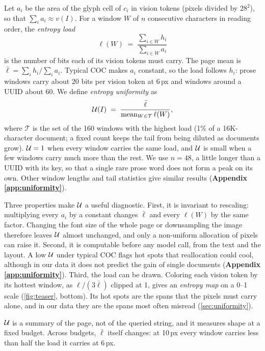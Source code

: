 Let $a_i$ be the area of the glyph cell of $c_i$ in vision tokens (pixels divided by $28^2$), so that $\sum_i a_i \approx v(I)$.
For a window $W$ of $n$ consecutive characters in reading order, the \emph{entropy load}
\begin{equation}
  \ell(W) \;=\; \frac{\sum_{i\in W} h_i}{\sum_{i\in W} a_i}
  \label{eq:load}
\end{equation}
is the number of bits each of its vision tokens must carry.
The page mean is $\bar\ell = \sum_i h_i / \sum_i a_i$.
Typical COC makes $a_i$ constant, so the load follows $h_i$: prose windows carry about 20 bits per vision token at 6\,px and windows around a UUID about 60.
We define \emph{entropy uniformity} as
\begin{equation}
  \mathcal{U}(I) \;=\; \frac{\bar\ell}{\operatorname{mean}_{W\in\mathcal{T}} \ell(W)} ,
  \label{eq:uniformity}
\end{equation}
where $\mathcal{T}$ is the set of the 160 windows with the highest load (1\% of a 16K-character document; a fixed count keeps the tail from being diluted as documents grow).
$\mathcal{U}=1$ when every window carries the same load, and $\mathcal{U}$ is small when a few windows carry much more than the rest.
We use $n=48$, a little longer than a UUID with its key, so that a single rare prose word does not form a peak on its own. Other window lengths and tail statistics give similar results (\textbf{Appendix \ref{app:uniformity}}).

Three properties make $\mathcal{U}$ a useful diagnostic.
First, it is invariant to rescaling: multiplying every $a_i$ by a constant changes $\bar\ell$ and every $\ell(W)$ by the same factor.
Changing the font size of the whole page or downsampling the image therefore leaves $\mathcal{U}$ almost unchanged, and only a non-uniform allocation of pixels can raise it.
Second, it is computable before any model call, from the text and the layout.
A low $\mathcal{U}$ under typical COC flags hot spots that reallocation could cool, although in our data it does not predict the gain of single documents (\textbf{Appendix \ref{app:uniformity}}).
Third, the load can be drawn.
Coloring each vision token by its hottest window, as $\ell/(3\bar\ell)$ clipped at 1, gives an \emph{entropy map} on a 0--1 scale (\cref{fig:teaser}, bottom).
Its hot spots are the spans that the pixels must carry alone, and in our data they are the spans most often misread (\cref{sec:uniformity}).

$\mathcal{U}$ is a summary of the page, not of the queried string, and it measures shape at a fixed budget.
Across budgets, $\bar\ell$ itself changes: at 10\,px every window carries less than half the load it carries at 6\,px.

